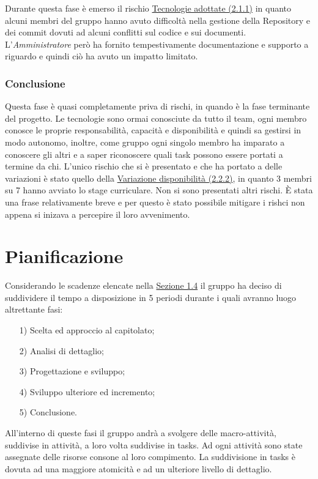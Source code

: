 \documentclass[a4paper]{article}
\begin{document}
				Durante questa fase è emerso il rischio \hyperref[Tecnologie adottate]{Tecnologie adottate (2.1.1)} in quanto alcuni membri del gruppo hanno avuto difficoltà nella gestione della Repository e dei commit dovuti ad alcuni conflitti sul codice e sui documenti. L'\emph{Amministratore} però ha fornito tempestivamente documentazione e supporto a riguardo e quindi ciò ha avuto un impatto limitato.

			\subsubsection{Conclusione}
				Questa fase è quasi completamente priva di rischi, in quando è la fase terminante del progetto. Le tecnologie sono ormai conosciute da tutto 
				il team, ogni membro conosce le proprie responsabilità, capacità e disponibilità e quindi sa gestirsi in modo autonomo, inoltre, come gruppo 
				ogni singolo membro ha imparato a conoscere gli altri e a saper riconoscere quali task possono essere portati a termine da chi.
				L'unico rischio che si è presentato e che ha portato a delle variazioni è stato quello della 
				\hyperref[VariazioneDisponibilita]{Variazione disponibilità (2.2.2)}, in quanto 3 membri su 7 hanno avviato lo stage curriculare. 
				Non si sono presentati altri rischi. È stata una frase relativamente breve e per questo è stato possibile mitigare i rishci non appena si 
				inizava a percepire il loro avvenimento.
				
				
	
	\newpage 
	\section{Pianificazione}
	
		Considerando le scadenze elencate nella \hyperref[Scadenze]{Sezione 1.4} il gruppo ha deciso di suddividere il tempo a disposizione in 5 
		periodi durante i quali avranno luogo altrettante fasi: 
		\begin{itemize}
			\item[1)] Scelta ed approccio al capitolato;
			\item[2)] Analisi di dettaglio;
			\item[3)] Progettazione e sviluppo;
			\item[4)] Sviluppo ulteriore ed incremento;
			\item[5)] Conclusione.
		\end{itemize}
		All'interno di queste fasi il gruppo andrà a svolgere delle macro-attività, suddivise in attività, a loro volta suddivise 
		in tasks. Ad ogni attività sono state assegnate delle risorse consone al loro compimento. La suddivisione in tasks è dovuta 
		ad una maggiore atomicità e ad un ulteriore livello di dettaglio.
		
\end{document}
